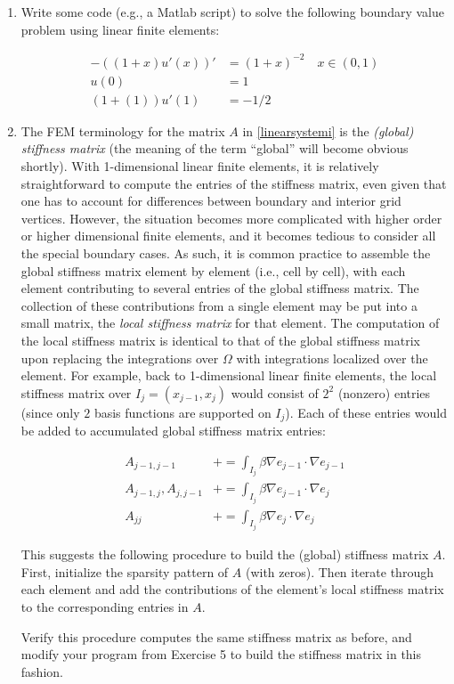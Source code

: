 \documentclass{article}
\begin{document}
\begin{enumerate}
\item Write some code (e.g., a Matlab script) to solve the following boundary value problem using linear finite elements:

\begin{subequations}
\begin{align}
-\left( \left( 1 + x \right) u'(x) \right)' & = \left( 1 + x \right)^{-2} \quad x \in (0, 1) \\
u(0) & = 1 \\
\left( 1 + (1) \right) u'(1) & = -1/2
\end{align}
\end{subequations}

\item The FEM terminology for the matrix \(A\) in \eqref{linearsystemi} is the {\em (global) stiffness matrix} (the meaning of the term ``global'' will become obvious shortly).  With 1-dimensional linear finite elements, it is relatively straightforward to compute the entries of the stiffness matrix, even given that one has to account for differences between boundary and interior grid vertices.  However, the situation becomes more complicated with higher order or higher dimensional finite elements, and it becomes tedious to consider all the special boundary cases.  As such, it is common practice to assemble the global stiffness matrix element by element (i.e., cell by cell), with each element contributing to several entries of the global stiffness matrix.  The collection of these contributions from a single element may be put into a small matrix, the {\em local stiffness matrix} for that element.  The computation of the local stiffness matrix is identical to that of the global stiffness matrix upon replacing the integrations over \(\Omega\) with integrations localized over the element.  For example, back to 1-dimensional linear finite elements, the local stiffness matrix over \(I_j = (x_{j-1}, x_j)\) would consist of \(2^2\) (nonzero) entries (since only \(2\) basis functions are supported on \(I_j\)).  Each of these entries would be added to accumulated global stiffness matrix entries:

\begin{subequations}
\begin{align}
A_{j-1,j-1}          & +\!\!= \int_{I_j} \beta \nabla e_{j-1} \cdot \nabla e_{j-1} \\
A_{j-1,j}, A_{j,j-1} & +\!\!= \int_{I_j} \beta \nabla e_{j-1} \cdot \nabla e_j \\
A_{jj}               & +\!\!= \int_{I_j} \beta \nabla e_j \cdot \nabla e_j
\end{align}
\end{subequations}

This suggests the following procedure to build the (global) stiffness matrix \(A\).  First, initialize the sparsity pattern of \(A\) (with zeros).  Then iterate through each element and add the contributions of the element's local stiffness matrix to the corresponding entries in \(A\).

Verify this procedure computes the same stiffness matrix as before, and modify your program from Exercise 5 to build the stiffness matrix in this fashion.

\end{enumerate}
\end{document}
